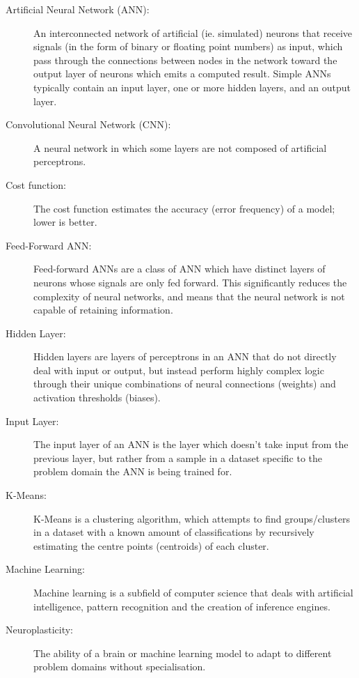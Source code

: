 \documentclass[]{report}
\begin{document}
\begin{description}
	\item[Artificial Neural Network (ANN):] An interconnected network of artificial (ie. simulated) neurons that receive signals (in the form of binary or floating point numbers) as input, which pass through the connections between nodes in the network toward the output layer of neurons which emits a computed result. Simple ANNs typically contain an input layer, one or more hidden layers, and an output layer.
	
	\item[Convolutional Neural Network (CNN):] A neural network in which some layers are not composed of artificial perceptrons.
	
	\item[Cost function:] The cost function estimates the accuracy (error frequency) of a model; lower is better.
	
	\item[Feed-Forward ANN:] Feed-forward ANNs are a class of ANN which have distinct layers of neurons whose signals are only fed forward. This significantly reduces the complexity of neural networks, and means that the neural network is not capable of retaining information.
	
	\item[Hidden Layer:] Hidden layers are layers of perceptrons in an ANN that do not directly deal with input or output, but instead perform highly complex logic through their unique combinations of neural connections (weights) and activation thresholds (biases).
	
	\item[Input Layer:] The input layer of an ANN is the layer which doesn't take input from the previous layer, but rather from a sample in a dataset specific to the problem domain the ANN is being trained for.
	
	\item[K-Means:] K-Means is a clustering algorithm, which attempts to find groups/clusters in a dataset with a known amount of classifications by recursively estimating the centre points (centroids) of each cluster.
	
	\item[Machine Learning:] Machine learning is a subfield of computer science that deals with artificial intelligence, pattern recognition and the creation of inference engines.
	
	\item[Neuroplasticity:] The ability of a brain or machine learning model to adapt to different problem domains without specialisation.
	

\end{description}
\end{document}

